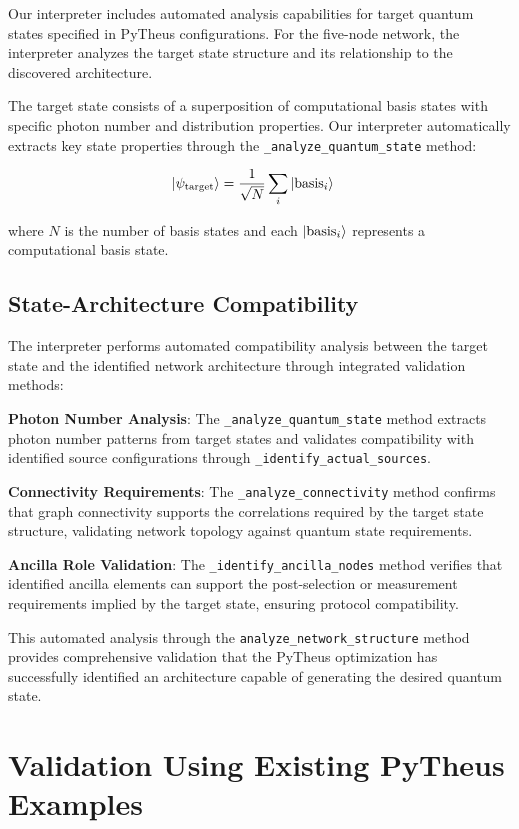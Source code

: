 \documentclass[11pt,a4paper]{article}
\begin{document}
Our interpreter includes automated analysis capabilities for target quantum states specified in PyTheus configurations. For the five-node network, the interpreter analyzes the target state structure and its relationship to the discovered architecture.

The target state consists of a superposition of computational basis states with specific photon number and distribution properties. Our interpreter automatically extracts key state properties through the \texttt{\_analyze\_quantum\_state} method:

\begin{align}
\ket{\psi_{\text{target}}} &= \frac{1}{\sqrt{N}} \sum_{i} \ket{\text{basis}_i}
\end{align}

where $N$ is the number of basis states and each $\ket{\text{basis}_i}$ represents a computational basis state.

\subsection{State-Architecture Compatibility}

The interpreter performs automated compatibility analysis between the target state and the identified network architecture through integrated validation methods:

\textbf{Photon Number Analysis}: The \texttt{\_analyze\_quantum\_state} method extracts photon number patterns from target states and validates compatibility with identified source configurations through \texttt{\_identify\_actual\_sources}.

\textbf{Connectivity Requirements}: The \texttt{\_analyze\_connectivity} method confirms that graph connectivity supports the correlations required by the target state structure, validating network topology against quantum state requirements.

\textbf{Ancilla Role Validation}: The \texttt{\_identify\_ancilla\_nodes} method verifies that identified ancilla elements can support the post-selection or measurement requirements implied by the target state, ensuring protocol compatibility.

This automated analysis through the \texttt{analyze\_network\_structure} method provides comprehensive validation that the PyTheus optimization has successfully identified an architecture capable of generating the desired quantum state.

\section{Validation Using Existing PyTheus Examples}
\end{document}
